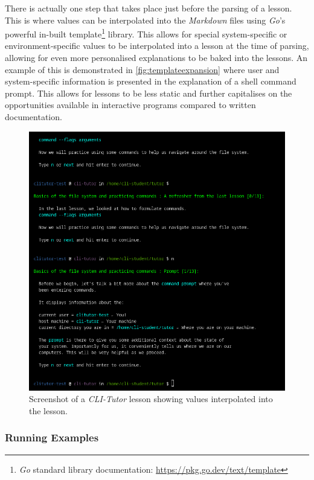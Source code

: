 There is actually one step that takes place just before the parsing of a
lesson. This is where values can be interpolated into the \textit{Markdown}
files using \textit{Go}'s powerful in-built template\footnote{\textit{Go}
    standard library documentation: \url{https://pkg.go.dev/text/template}}
    library. This allows for special system-specific or environment-specific
    values to be interpolated into a lesson at the time of parsing, allowing
    for even more personalised explanations to be baked into the lessons. An
    example of this is demonstrated in \autoref{fig:templateexpansion} where
    user and system-specific information is presented in the explanation of a
    shell command prompt. This allows for lessons to be less static and further
    capitalises on the opportunities available in interactive programs compared
    to written documentation.

\begin{figure}[htbp]
	\centering
	\includegraphics[width=1\textwidth]{img/cliexpansionfull}
	\caption{Screenshot of a \textit{CLI-Tutor} lesson showing values interpolated into the lesson.}
	\label{fig:templateexpansion}
\end{figure}

\subsubsection{Running Examples}

